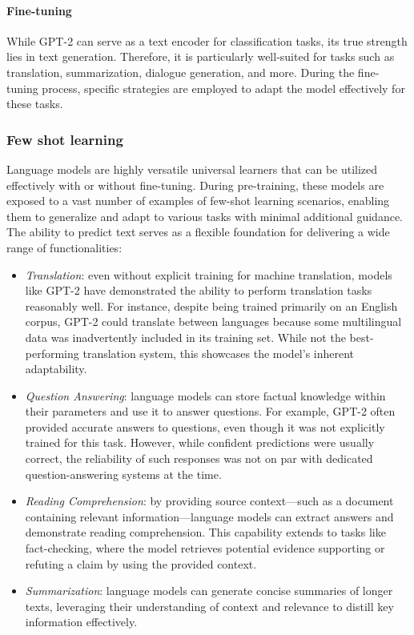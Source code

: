 \paragraph{Fine-tuning}
While GPT-2 can serve as a text encoder for classification tasks, its true strength lies in text generation. 
Therefore, it is particularly well-suited for tasks such as translation, summarization, dialogue generation, and more. 
During the fine-tuning process, specific strategies are employed to adapt the model effectively for these tasks. 

\subsubsection{Few shot learning}
Language models are highly versatile universal learners that can be utilized effectively with or without fine-tuning. 
During pre-training, these models are exposed to a vast number of examples of few-shot learning scenarios, enabling them to generalize and adapt to various tasks with minimal additional guidance. 
The ability to predict text serves as a flexible foundation for delivering a wide range of functionalities:
\begin{itemize}
    \item \textit{Translation}: even without explicit training for machine translation, models like GPT-2 have demonstrated the ability to perform translation tasks reasonably well. 
        For instance, despite being trained primarily on an English corpus, GPT-2 could translate between languages because some multilingual data was inadvertently included in its training set.
         While not the best-performing translation system, this showcases the model's inherent adaptability.
    \item \textit{Question Answering}: language models can store factual knowledge within their parameters and use it to answer questions. 
        For example, GPT-2 often provided accurate answers to questions, even though it was not explicitly trained for this task. 
        However, while confident predictions were usually correct, the reliability of such responses was not on par with dedicated question-answering systems at the time.
    \item \textit{Reading Comprehension}: by providing source context—such as a document containing relevant information—language models can extract answers and demonstrate reading comprehension. 
        This capability extends to tasks like fact-checking, where the model retrieves potential evidence supporting or refuting a claim by using the provided context.
    \item \textit{Summarization}: language models can generate concise summaries of longer texts, leveraging their understanding of context and relevance to distill key information effectively.
\end{itemize}
